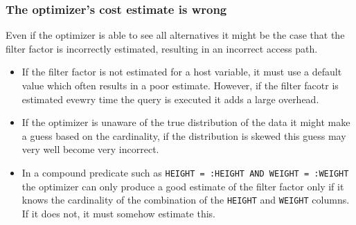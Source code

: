 \subsubsection{The optimizer's cost estimate is wrong}
Even if the optimizer is able to see all alternatives it might be the case that the filter factor is incorrectly estimated, resulting in an incorrect access path.

\begin{itemize}
    \item If the filter factor is not estimated for a host variable, it must use a default value which often results in a poor estimate. However, if the filter facotr is estimated evewry time the query is executed it adds a large overhead.
    \item If the optimizer is unaware of the true distribution of the data it might make a guess based on the cardinality, if the distribution is skewed this guess may very well become very incorrect.
    \item In a compound predicate such as \texttt{HEIGHT = :HEIGHT AND WEIGHT = :WEIGHT} the optimizer can only produce a good estimate of the filter factor only if it knows the cardinality of the combination of the \texttt{HEIGHT} and \texttt{WEIGHT} columns. If it does not, it must somehow estimate this.
\end{itemize}
